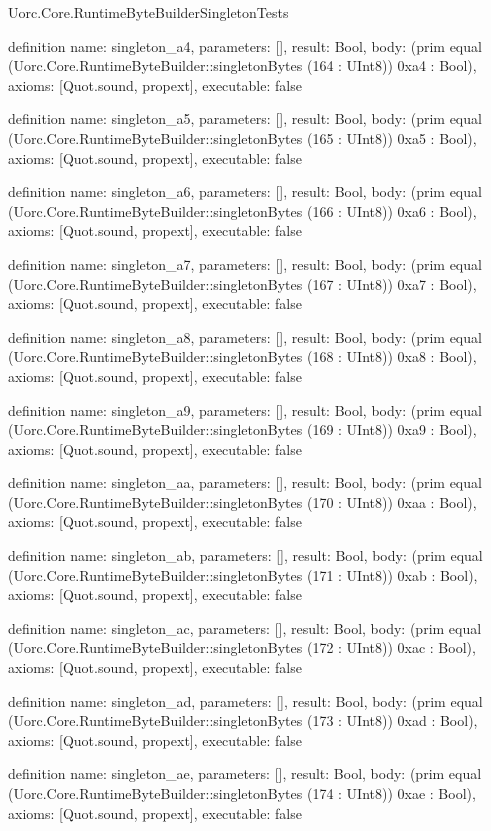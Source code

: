 \begin{lexlean}{Uorc.Core.RuntimeByteBuilderSingletonTests}
\begin{semanticmodule}
definition{
  name: singleton_a4,
  parameters: [],
  result: Bool,
  body: (prim equal (Uorc.Core.RuntimeByteBuilder::singletonBytes (164 : UInt8)) 0xa4 : Bool),
  axioms: [Quot.sound, propext],
  executable: false
}

definition{
  name: singleton_a5,
  parameters: [],
  result: Bool,
  body: (prim equal (Uorc.Core.RuntimeByteBuilder::singletonBytes (165 : UInt8)) 0xa5 : Bool),
  axioms: [Quot.sound, propext],
  executable: false
}

definition{
  name: singleton_a6,
  parameters: [],
  result: Bool,
  body: (prim equal (Uorc.Core.RuntimeByteBuilder::singletonBytes (166 : UInt8)) 0xa6 : Bool),
  axioms: [Quot.sound, propext],
  executable: false
}

definition{
  name: singleton_a7,
  parameters: [],
  result: Bool,
  body: (prim equal (Uorc.Core.RuntimeByteBuilder::singletonBytes (167 : UInt8)) 0xa7 : Bool),
  axioms: [Quot.sound, propext],
  executable: false
}

definition{
  name: singleton_a8,
  parameters: [],
  result: Bool,
  body: (prim equal (Uorc.Core.RuntimeByteBuilder::singletonBytes (168 : UInt8)) 0xa8 : Bool),
  axioms: [Quot.sound, propext],
  executable: false
}

definition{
  name: singleton_a9,
  parameters: [],
  result: Bool,
  body: (prim equal (Uorc.Core.RuntimeByteBuilder::singletonBytes (169 : UInt8)) 0xa9 : Bool),
  axioms: [Quot.sound, propext],
  executable: false
}

definition{
  name: singleton_aa,
  parameters: [],
  result: Bool,
  body: (prim equal (Uorc.Core.RuntimeByteBuilder::singletonBytes (170 : UInt8)) 0xaa : Bool),
  axioms: [Quot.sound, propext],
  executable: false
}

definition{
  name: singleton_ab,
  parameters: [],
  result: Bool,
  body: (prim equal (Uorc.Core.RuntimeByteBuilder::singletonBytes (171 : UInt8)) 0xab : Bool),
  axioms: [Quot.sound, propext],
  executable: false
}

definition{
  name: singleton_ac,
  parameters: [],
  result: Bool,
  body: (prim equal (Uorc.Core.RuntimeByteBuilder::singletonBytes (172 : UInt8)) 0xac : Bool),
  axioms: [Quot.sound, propext],
  executable: false
}

definition{
  name: singleton_ad,
  parameters: [],
  result: Bool,
  body: (prim equal (Uorc.Core.RuntimeByteBuilder::singletonBytes (173 : UInt8)) 0xad : Bool),
  axioms: [Quot.sound, propext],
  executable: false
}

definition{
  name: singleton_ae,
  parameters: [],
  result: Bool,
  body: (prim equal (Uorc.Core.RuntimeByteBuilder::singletonBytes (174 : UInt8)) 0xae : Bool),
  axioms: [Quot.sound, propext],
  executable: false
}


\end{semanticmodule}
\end{lexlean}
